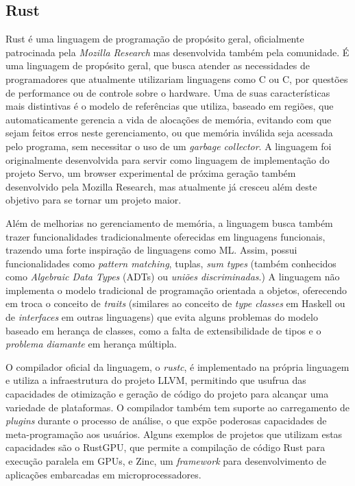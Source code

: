 \documentclass[12pt]{article}
\def\Cpp{{C\nolinebreak[4]\raisebox{.20ex}{\small\bf++}}}
\begin{document}
\subsection{Rust}

Rust\citep{rust} é uma linguagem de programação de propósito geral, oficialmente patrocinada pela
\emph{Mozilla Research} mas desenvolvida também pela comunidade. É uma linguagem de propósito geral,
que busca atender as necessidades de programadores que atualmente utilizariam linguagens como C ou
\Cpp, por questões de performance ou de controle sobre o hardware. Uma de suas características mais
distintivas é o modelo de referências que utiliza, baseado em regiões\citep{tofte1997}, que
automaticamente gerencia a vida de alocações de memória, evitando com que sejam feitos erros neste
gerenciamento, ou que memória inválida seja acessada pelo programa, sem necessitar o uso de um
\emph{garbage collector}. A linguagem foi originalmente desenvolvida para servir como linguagem de
implementação do projeto Servo\citep{servo}, um browser experimental de próxima geração também
desenvolvido pela Mozilla Research, mas atualmente já cresceu além deste objetivo para se tornar um
projeto maior.

Além de melhorias no gerenciamento de memória, a linguagem busca também trazer funcionalidades
tradicionalmente oferecidas em linguagens funcionais, trazendo uma forte inspiração de linguagens
como ML\citep{milner1997}. Assim, possui funcionalidades como \emph{pattern matching}, tuplas,
\emph{sum types} (também conhecidos como \emph{Algebraic Data Types} (ADTs) ou \emph{uniões
discriminadas}.) A linguagem não implementa o modelo tradicional de programação orientada a objetos,
oferecendo em troca o conceito de \emph{traits} (similares ao conceito de \emph{type classes} em
Haskell ou de \emph{interfaces} em outras linguagens) que evita alguns problemas do modelo baseado
em herança de classes, como a falta de extensibilidade de tipos e o \emph{problema diamante} em
herança múltipla\citep{scharli2003}.

O compilador oficial da linguagem, o \emph{rustc}, é implementado na própria linguagem e utiliza a
infraestrutura do projeto LLVM\citep{lattner2004}, permitindo que usufrua das capacidades de
otimização e geração de código do projeto para alcançar uma variedade de plataformas. O compilador
também tem suporte ao carregamento de \emph{plugins} durante o processo de análise, o que expõe
poderosas capacidades de meta-programação aos usuários. Alguns exemplos de projetos que utilizam
estas capacidades são o RustGPU\citep{holk2013}, que permite a compilação de código Rust para
execução paralela em GPUs, e Zinc\citep{zinc}, um \emph{framework} para desenvolvimento de
aplicações embarcadas em microprocessadores.
\end{document}
